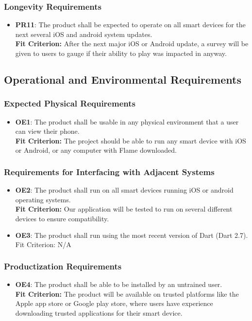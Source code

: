 \documentclass[12pt, titlepage]{article}
\begin{document}
\subsubsection{Longevity Requirements}
\begin{itemize}
\item \textbf{PR11}: The product shall be expected to operate on all smart devices for the next several iOS and android system updates.\\
\textbf{Fit Criterion:} After the next major iOS or Android update, a survey will be given to users to gauge if their ability to play was impacted in anyway. 
\end{itemize}

\subsection{Operational and Environmental Requirements}


\subsubsection{Expected Physical Requirements}
\begin{itemize}
\item \textbf{OE1}: The product shall be usable in any physical environment that a user can view their phone.\\
\textbf{Fit Criterion:} The project should be able to run any smart device with iOS or Android, or any computer with Flame downloaded.
\end{itemize}

\subsubsection{Requirements for Interfacing with Adjacent Systems}
\begin{itemize}
\item \textbf{OE2}: The product shall run on all smart devices running iOS or android operating systems. \\
\textbf{Fit Criterion:} Our application will be tested to run on several different devices to ensure compatibility.
\item \textbf{OE3}: The product shall run using the most recent version of Dart (Dart 2.7).\\
Fit Criterion: N/A
\end{itemize}

\subsubsection{Productization Requirements}
\begin{itemize}
    \item \textbf{OE4}: The product shall be able to be installed by an untrained user.\\
    \textbf{Fit Criterion:} The product will be available on trusted platforms like the Apple app store or   Google play store, where users have experience downloading trusted applications for their smart device. 
\end{itemize}
\end{document}
